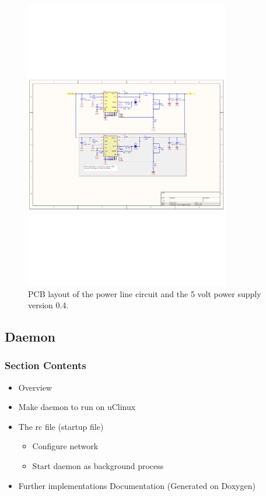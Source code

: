 \begin{figure}[H]
	\begin{centering}
		 \includegraphics[width=0.8\textwidth,page=3,angle=0]{images/SIG60_v0_4}
		\caption{PCB layout of the power line circuit and the 5 volt power supply version 0.4.}
	\end{centering}
\end{figure}


\subsection{Daemon}
\subsubsection{Section Contents}
\begin{itemize}
	\item Overview
	\item Make daemon to run on uClinux
	\item The rc file (startup file)
	\begin{itemize}
		\item Configure network
		\item Start daemon as background process
	\end{itemize}
	\item Further implementations
	\imte Documentation (Generated on Doxygen)
\end{itemize}

